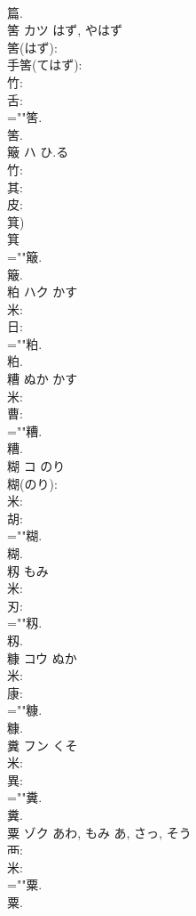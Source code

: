 \documentclass[8pt]{extreport}
\begin{document}
\begin{CJK}{UTF8}{min}
\\	篇.
\\	筈	カツ	はず, やはず		
\\	筈(はず): 
\\	手筈(てはず): 
\\	竹: 
\\	舌: 
\\	=""筈.
\\	筈.
\\	簸	ハ	ひ.る		
\\	竹: 
\\	其: 
\\	皮: 
\\	箕) 
\\	箕 
\\	=""簸.
\\	簸.
\\	粕	ハク	かす		
\\	米: 
\\	日: 
\\	=""粕.
\\	粕.
\\	糟		ぬか	かす			
\\	米: 
\\	曹: 
\\	=""糟.
\\	糟.
\\	糊	コ	のり		
\\	糊(のり): 
\\	米: 
\\	胡: 
\\	=""糊.
\\	糊.
\\	籾		もみ				
\\	米: 
\\	刃: 
\\	=""籾.
\\	籾.
\\	糠	コウ	ぬか		
\\	米: 
\\	康: 
\\	=""糠.
\\	糠.
\\	糞	フン	くそ		
\\	米: 
\\	異: 
\\	=""糞.
\\	糞.
\\	粟	ゾク	あわ, もみ	あ, さっ, そう	
\\	襾: 
\\	米: 
\\	=""粟.
\\	粟.

\end{CJK}
\end{document}
